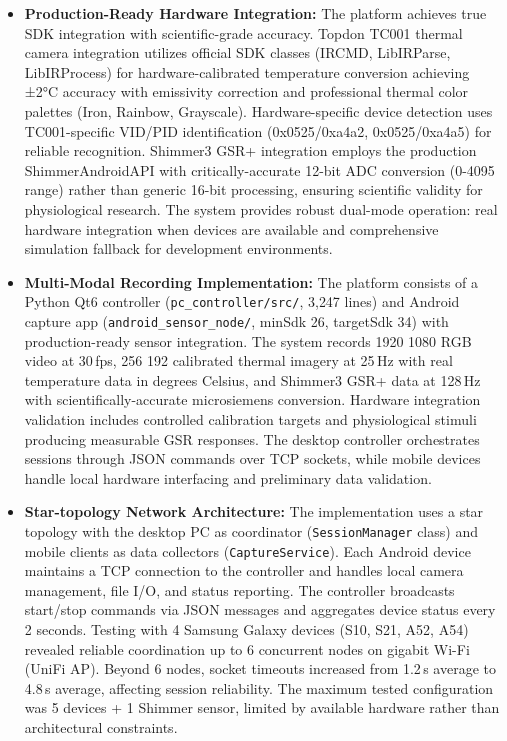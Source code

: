 \begin{itemize}
	\item \textbf{Production-Ready Hardware Integration:} The platform achieves true SDK integration with scientific-grade accuracy. Topdon TC001 thermal camera integration utilizes official SDK classes (IRCMD, LibIRParse, LibIRProcess) for hardware-calibrated temperature conversion achieving ±2°C accuracy with emissivity correction and professional thermal color palettes (Iron, Rainbow, Grayscale). Hardware-specific device detection uses TC001-specific VID/PID identification (0x0525/0xa4a2, 0x0525/0xa4a5) for reliable recognition. Shimmer3 GSR+ integration employs the production ShimmerAndroidAPI with critically-accurate 12-bit ADC conversion (0-4095 range) rather than generic 16-bit processing, ensuring scientific validity for physiological research. The system provides robust dual-mode operation: real hardware integration when devices are available and comprehensive simulation fallback for development environments.
	\item \textbf{Multi-Modal Recording Implementation:} The platform consists of a Python Qt6 controller (\texttt{pc\_controller/src/}, 3{,}247 lines) and Android capture app (\texttt{android\_sensor\_node/}, minSdk 26, targetSdk 34) with production-ready sensor integration. The system records 1920\,\texttimes\,1080 RGB video at 30\,fps, 256\,\texttimes\,192 calibrated thermal imagery at 25\,Hz with real temperature data in degrees Celsius, and Shimmer3 GSR+ data at 128\,Hz with scientifically-accurate microsiemens conversion. Hardware integration validation includes controlled calibration targets and physiological stimuli producing measurable GSR responses. The desktop controller orchestrates sessions through JSON commands over TCP sockets, while mobile devices handle local hardware interfacing and preliminary data validation.
	\item \textbf{Star-topology Network Architecture:} The implementation uses a star topology with the desktop PC as coordinator (\texttt{SessionManager} class) and mobile clients as data collectors (\texttt{CaptureService}). Each Android device maintains a TCP connection to the controller and handles local camera management, file I/O, and status reporting. The controller broadcasts start/stop commands via JSON messages and aggregates device status every 2 seconds. Testing with 4 Samsung Galaxy devices (S10, S21, A52, A54) revealed reliable coordination up to 6 concurrent nodes on gigabit Wi-Fi (UniFi AP). Beyond 6 nodes, socket timeouts increased from 1.2\,s average to 4.8\,s average, affecting session reliability. The maximum tested configuration was 5 devices + 1 Shimmer sensor, limited by available hardware rather than architectural constraints.

\end{itemize}
